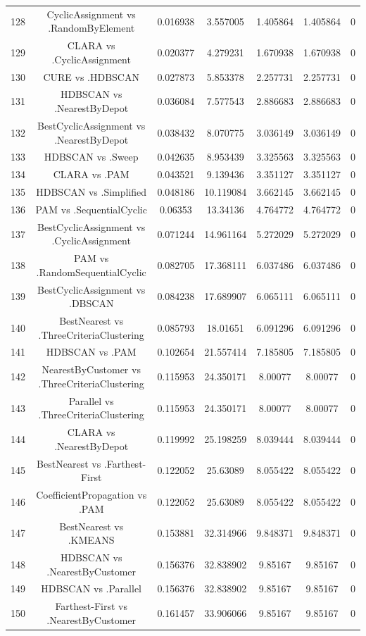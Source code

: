 \documentclass[a4paper,10pt]{article}
\begin{document}
\begin{landscape}
\begin{table}[!htp]
\begin{tabular}{ccccccc}
128&CyclicAssignment vs .RandomByElement&0.016938&3.557005&1.405864&1.405864&0\\
129&CLARA vs .CyclicAssignment&0.020377&4.279231&1.670938&1.670938&0\\
130&CURE vs .HDBSCAN&0.027873&5.853378&2.257731&2.257731&0\\
131&HDBSCAN vs .NearestByDepot&0.036084&7.577543&2.886683&2.886683&0\\
132&BestCyclicAssignment vs .NearestByDepot&0.038432&8.070775&3.036149&3.036149&0\\
133&HDBSCAN vs .Sweep&0.042635&8.953439&3.325563&3.325563&0\\
134&CLARA vs .PAM&0.043521&9.139436&3.351127&3.351127&0\\
135&HDBSCAN vs .Simplified&0.048186&10.119084&3.662145&3.662145&0\\
136&PAM vs .SequentialCyclic&0.06353&13.34136&4.764772&4.764772&0\\
137&BestCyclicAssignment vs .CyclicAssignment&0.071244&14.961164&5.272029&5.272029&0\\
138&PAM vs .RandomSequentialCyclic&0.082705&17.368111&6.037486&6.037486&0\\
139&BestCyclicAssignment vs .DBSCAN&0.084238&17.689907&6.065111&6.065111&0\\
140&BestNearest vs .ThreeCriteriaClustering&0.085793&18.01651&6.091296&6.091296&0\\
141&HDBSCAN vs .PAM&0.102654&21.557414&7.185805&7.185805&0\\
142&NearestByCustomer vs .ThreeCriteriaClustering&0.115953&24.350171&8.00077&8.00077&0\\
143&Parallel vs .ThreeCriteriaClustering&0.115953&24.350171&8.00077&8.00077&0\\
144&CLARA vs .NearestByDepot&0.119992&25.198259&8.039444&8.039444&0\\
145&BestNearest vs .Farthest-First&0.122052&25.63089&8.055422&8.055422&0\\
146&CoefficientPropagation vs .PAM&0.122052&25.63089&8.055422&8.055422&0\\
147&BestNearest vs .KMEANS&0.153881&32.314966&9.848371&9.848371&0\\
148&HDBSCAN vs .NearestByCustomer&0.156376&32.838902&9.85167&9.85167&0\\
149&HDBSCAN vs .Parallel&0.156376&32.838902&9.85167&9.85167&0\\
150&Farthest-First vs .NearestByCustomer&0.161457&33.906066&9.85167&9.85167&0\\

\end{tabular}
\end{table}
\end{landscape}
\end{document}
